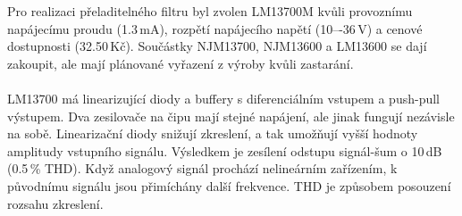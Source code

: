\begin{center}
\begin{table}[h]
  \caption[Porovnání integrovaných obvodů se dvěma OTA]{\label{tab:Porovnání IO se dvěma OTA}Porovnání IO se dvěma OTA \cite{18}}
  \end{table}
\end{center}
\noindent Pro realizaci přeladitelného filtru byl zvolen LM13700M kvůli provoznímu napájecímu proudu (1.3\,mA), rozpětí napájecího napětí (10–-36\,V) a cenové dostupnosti (32.50\,Kč). Součástky NJM13700, NJM13600 a LM13600 se dají zakoupit, ale mají plánované vyřazení z výroby kvůli zastarání. \\
\\
LM13700 má linearizující diody a buffery s diferenciálním vstupem a push-pull výstupem. Dva zesilovače na čipu mají stejné napájení, ale jinak fungují nezávisle na sobě. Linearizační diody snižují zkreslení, a tak umožňují vyšší hodnoty amplitudy vstupního signálu. Výsledkem je zesílení odstupu signál-šum o 10\,dB (0.5\,\% THD). Když analogový signál prochází nelineárním zařízením, k původnímu signálu jsou přimíchány další frekvence. THD je způsobem posouzení rozsahu zkreslení.\\
